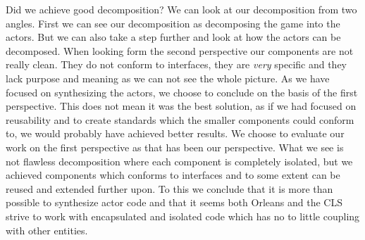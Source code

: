 Did we achieve good decomposition? We can look at our decomposition from two angles. First we can see our decomposition as decomposing the game into the actors. But we can also take a step further and look at how the actors can be decomposed. When looking form the second perspective our components are not really clean. They do not conform to interfaces, they are \textit{very} specific and they lack purpose and meaning as we can not see the whole picture. As we have focused on synthesizing the actors, we choose to conclude on the basis of the first perspective. This does not mean it was the best solution, as if we had focused on reusability and to create standards which the smaller components could conform to, we would probably have achieved better results. We choose to evaluate our work on the first perspective as that has been our perspective. What we see is not flawless decomposition where each component is completely isolated, but we achieved components which conforms to interfaces and to some extent can be reused and extended further upon. To this we conclude that it is more than possible to synthesize actor code and that it seems both Orleans and the CLS strive to work with encapsulated and isolated code which has no to little coupling with other entities.


